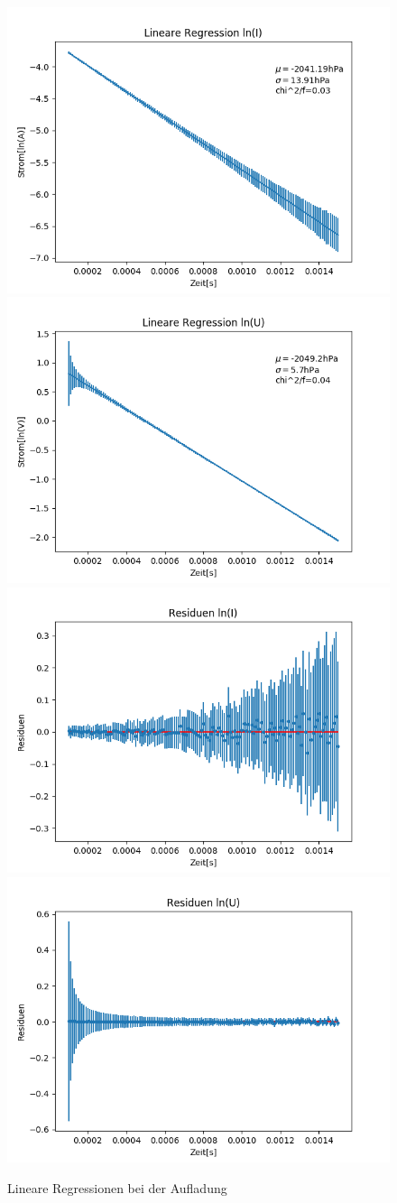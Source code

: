 \documentclass[12pt,a4paper]{article}
\begin{document}
\begin{figure}
\begin{center}
\includegraphics[width=0.49\linewidth]{Bilder/Kondensator_auf_linI}
\includegraphics[width=0.49\linewidth]{Bilder/Kondensator_auf_linU}
\includegraphics[width=0.49\linewidth]{Bilder/Kondensator_auf_resI}
\includegraphics[width=0.49\linewidth]{Bilder/Kondensator_auf_resU}
\caption[Rohdaten logarith. A]{Lineare Regressionen bei der Aufladung}
\label{fig:linAuf}
\end{center}
\end{figure}
\end{document}
